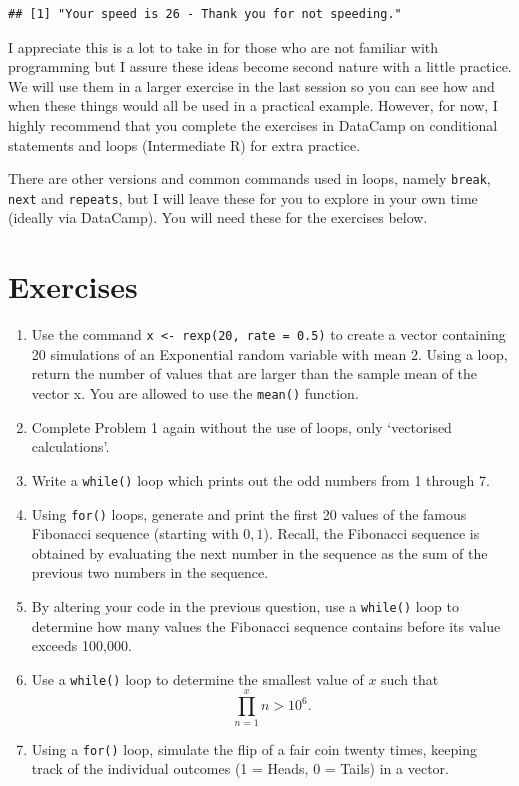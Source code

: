 \documentclass[
]{book}
\theoremstyle{definition}
\theoremstyle{definition}
\theoremstyle{definition}
\theoremstyle{definition}
\theoremstyle{remark}
\begin{document}
\begin{verbatim}
## [1] "Your speed is 26 - Thank you for not speeding."
\end{verbatim}

I appreciate this is a lot to take in for those who are not familiar with programming but I assure these ideas become second nature with a little practice. We will use them in a larger exercise in the last session so you can see how and when these things would all be used in a practical example. However, for now, I highly recommend that you complete the exercises in DataCamp on conditional statements and loops (Intermediate R) for extra practice.

There are other versions and common commands used in loops, namely \texttt{break}, \texttt{next} and \texttt{repeats}, but I will leave these for you to explore in your own time (ideally via DataCamp). You will need these for the exercises below.

\hypertarget{exercises-4}{%
\section{Exercises}\label{exercises-4}}

\begin{enumerate}
\def\labelenumi{\arabic{enumi}.}
\item
  Use the command \texttt{x\ \textless{}-\ rexp(20,\ rate\ =\ 0.5)} to create a vector containing 20 simulations of an Exponential random variable with mean \(2\). Using a loop, return the number of values that are larger than the sample mean of the vector x. You are allowed to use the \texttt{mean()} function.
\item
  Complete Problem 1 again without the use of loops, only `vectorised calculations'.
\item
  Write a \texttt{while()} loop which prints out the odd numbers from 1 through 7.
\item
  Using \texttt{for()} loops, generate and print the first 20 values of the famous Fibonacci sequence (starting with \(0, 1\)). Recall, the Fibonacci sequence is obtained by evaluating the next number in the sequence as the sum of the previous two numbers in the sequence.
\item
  By altering your code in the previous question, use a \texttt{while()} loop to determine how many values the Fibonacci sequence contains before its value exceeds 100,000.
\item
  Use a \texttt{while()} loop to determine the smallest value of \(x\) such that
  \begin{equation*}
  \prod_{n=1}^x n > 10^{6}.
  \end{equation*}
\item
  Using a \texttt{for()} loop, simulate the flip of a fair coin twenty times, keeping track of the individual outcomes (1 = Heads, 0 = Tails) in a vector.
\end{enumerate}
\end{document}
